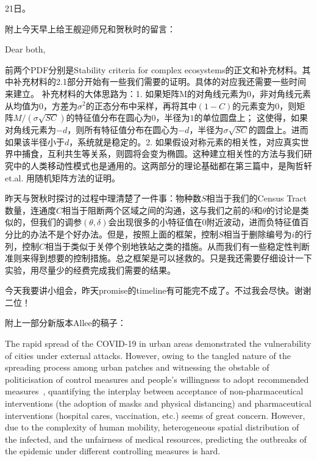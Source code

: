 21日。

附上今天早上给王舰迎师兄和贺秋时的留言：

Dear both, 

前两个PDF分别是Stability criteria for complex ecosystems的正文和补充材料。其中补充材料的2.1部分开始有一些我们需要的证明。具体的对应我还需要一些时间来建立。
补充材料的大体思路为：1. 如果矩阵M的对角线元素为0，非对角线元素从均值为0，方差为$\sigma^2$的正态分布中采样，再将其中$(1-C)$的元素变为$0$，则矩阵$M/(\sigma \sqrt{SC})$的特征值分布在圆心为$0$，半径为$1$的单位圆盘上； 这使得，如果对角线元素为$-d$，则所有特征值分布在圆心为$-d$，半径为$\sigma\sqrt{SC}$的圆盘上。进而如果该半径小于$d$，系统就是稳定的。2. 如果假设对称元素的相关性，对应真实世界中捕食，互利共生等关系，则圆将会变为椭圆。这种建立相关性的方法与我们研究中的人类移动性模式也是通用的。这两部分的理论基础都在第三篇中，是陶哲轩et.al. 用随机矩阵方法的证明。

昨天与贺秋时探讨的过程中理清楚了一件事：物种数$S$相当于我们的Census Tract数量，连通度$C$相当于阻断两个区域之间的沟通，这与我们之前的$\delta$和$\theta$的讨论是类似的，但我们的调参$(\theta, \delta)$会出现很多的小特征值在0附近波动，进而负特征值百分比的办法不是个好办法。但是，按照上面的框架，控制$S$相当于删除编号为$i$的行列，控制$C$相当于类似于关停个别地铁站之类的措施。从而我们有一些稳定性判断准则来得到想要的控制措施。总之框架是可以拯救的。只是我还需要仔细设计一下实验，用尽量少的经费完成我们需要的结果。

今天我要讲小组会，昨天promise的timeline有可能完不成了。不过我会尽快。谢谢二位！

\dotfill

附上一部分新版本Allee的稿子：

The rapid spread of the COVID-19 in urban areas demonstrated the vulnerability of cities under external attacks. However, owing to the tangled nature of the spreading process among urban patches and witnessing the obstable of politicisation of control measures and people's willingness to adopt recommended measures~\cite{wells2021interplay}, quantifying the interplay between acceptance of non-pharmaceutical interventions (the adoption of masks and physical distancing) and pharmaceutical interventions (hospital cares, vaccination, etc.) seems of great concern. However, due to the complexity of human mobility, heterogeneous spatial distribution of the infected, and the unfairness of medical resources, predicting the outbreaks of the epidemic under different controlling measures is hard.

